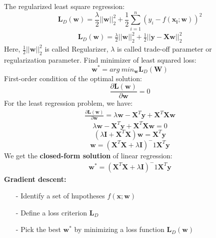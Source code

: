 \documentclass[journal, a4paper]{IEEEtran}
\begin{document}
The regularized least square regression:
\begin{displaymath}
\boldsymbol{L}_D(\boldsymbol{w})=\frac{\lambda}{2}||\boldsymbol{w}||^{2}_2 + \frac{1}{2}\sum_{i=1}^n(y_i-f(\boldsymbol{x_i};\boldsymbol{w}))^2
\end{displaymath}
\begin{eqnarray}
\boldsymbol{L}_D(\boldsymbol{w})=\frac{\lambda}{2}||\boldsymbol{w}||^{2}_2 + \frac{1}{2}||\boldsymbol{y}-\boldsymbol{Xw}||_2^2
\end{eqnarray}
Here, $\frac{1}{2}||\boldsymbol{w}||_2^2$ is called Regularizer, $\lambda$ is called trade-off parameter or regularization parameter.
Find minimizer of least squared loss:
\begin{displaymath}
\boldsymbol{w}^*=arg\:min_{\boldsymbol{w}} \boldsymbol{L}_D(\boldsymbol{W})
\end{displaymath}
First-order condition of the optimal solution:
\begin{displaymath}
\frac{\partial\boldsymbol{L}(\boldsymbol{w})}{\partial\boldsymbol{w}}=0
\end{displaymath}
For the least regression problem, we have:
\begin{eqnarray}
\frac{\partial\boldsymbol{L}(\boldsymbol{w})}{\partial\boldsymbol{w}}=\lambda\boldsymbol{w}-\boldsymbol{X}^T\boldsymbol{y}+\boldsymbol{X}^T\boldsymbol{Xw}
\end{eqnarray}
\begin{displaymath}
\lambda\boldsymbol{w}-\boldsymbol{X}^T\boldsymbol{y}+\boldsymbol{X}^T\boldsymbol{Xw}=0
\end{displaymath}
\begin{displaymath}
(\lambda\boldsymbol{I}+\boldsymbol{X}^T\boldsymbol{X})\boldsymbol{w}=\boldsymbol{X}^T\boldsymbol{y}
\end{displaymath}
\begin{displaymath}
\boldsymbol{w}=(\boldsymbol{X}^T\boldsymbol{X}+\lambda\boldsymbol{I})^-1\boldsymbol{X}^T\boldsymbol{y}
\end{displaymath}
We get the \textbf{closed-form solution} of linear regression:
\begin{eqnarray}
\boldsymbol{w}^*=(\boldsymbol{X}^T\boldsymbol{X}+\lambda\boldsymbol{I})^-1\boldsymbol{X}^T\boldsymbol{y}
\end{eqnarray}
\textbf{Gradient descent:}
\begin{itemize}
\item[-] Identify a set of hupotheses $f(\boldsymbol{x};\boldsymbol{w})$
\item[-] Define a loss criterion $\boldsymbol{L}_D$
\item[-] Pick the best $\boldsymbol{w}^*$ by minimizing a loss function $\boldsymbol{L}_D(\boldsymbol{w})$
\end{itemize}
\end{document}
